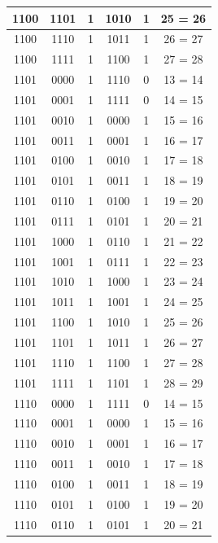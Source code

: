 \documentclass{exam}
\begin{document}
\begin{center}
\begin{longtable}{|c|c|c|c|c|c|}
                1100 & 1101 & 1 & 1010 & 1 & 25 = 26 \\ \hline
                1100 & 1110 & 1 & 1011 & 1 & 26 = 27 \\ \hline
                1100 & 1111 & 1 & 1100 & 1 & 27 = 28 \\ \hline
                1101 & 0000 & 1 & 1110 & 0 & 13 = 14 \\ \hline
                1101 & 0001 & 1 & 1111 & 0 & 14 = 15 \\ \hline
                1101 & 0010 & 1 & 0000 & 1 & 15 = 16 \\ \hline
                1101 & 0011 & 1 & 0001 & 1 & 16 = 17 \\ \hline
                1101 & 0100 & 1 & 0010 & 1 & 17 = 18 \\ \hline
                1101 & 0101 & 1 & 0011 & 1 & 18 = 19 \\ \hline
                1101 & 0110 & 1 & 0100 & 1 & 19 = 20 \\ \hline
                1101 & 0111 & 1 & 0101 & 1 & 20 = 21 \\ \hline
                1101 & 1000 & 1 & 0110 & 1 & 21 = 22 \\ \hline
                1101 & 1001 & 1 & 0111 & 1 & 22 = 23 \\ \hline
                1101 & 1010 & 1 & 1000 & 1 & 23 = 24 \\ \hline
                1101 & 1011 & 1 & 1001 & 1 & 24 = 25 \\ \hline
                1101 & 1100 & 1 & 1010 & 1 & 25 = 26 \\ \hline
                1101 & 1101 & 1 & 1011 & 1 & 26 = 27 \\ \hline
                1101 & 1110 & 1 & 1100 & 1 & 27 = 28 \\ \hline
                1101 & 1111 & 1 & 1101 & 1 & 28 = 29 \\ \hline
                1110 & 0000 & 1 & 1111 & 0 & 14 = 15 \\ \hline
                1110 & 0001 & 1 & 0000 & 1 & 15 = 16 \\ \hline
                1110 & 0010 & 1 & 0001 & 1 & 16 = 17 \\ \hline
                1110 & 0011 & 1 & 0010 & 1 & 17 = 18 \\ \hline
                1110 & 0100 & 1 & 0011 & 1 & 18 = 19 \\ \hline
                1110 & 0101 & 1 & 0100 & 1 & 19 = 20 \\ \hline
                1110 & 0110 & 1 & 0101 & 1 & 20 = 21 \\ \hline

\end{longtable}
\end{center}
\end{document}
